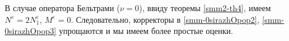 В случае оператора Бельтрами ($\nu=0$), ввиду теоремы \ref{smm2-th4}, имеем
$N^\varepsilon=2N_1^\varepsilon$, $M^\varepsilon=0$. Следовательно, корректоры в \eqref{smm-0sirazhOpop2}, \eqref{smm-0sirazhOpop3} упрощаются
и мы имеем более простые оценки.



%
%



